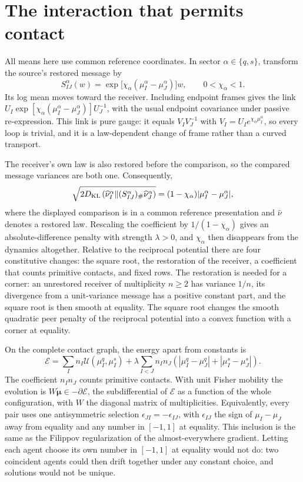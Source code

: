 \section{The interaction that permits contact}

All means here use common reference coordinates. In sector $\alpha\in\{q,s\}$, transform the source's restored message by
\begin{equation}
S_{IJ}^\alpha(w)=\exp\bigl[\chi_\alpha(\mu_I^\alpha-\mu_J^\alpha)\bigr]w,
\qquad 0<\chi_\alpha<1.
\end{equation}
Its log mean moves toward the receiver. Including endpoint frames gives the link $U_I\exp[\chi_\alpha(\mu_I^\alpha-\mu_J^\alpha)]U_J^{-1}$, with the usual endpoint covariance under passive re-expression. This link is pure gauge: it equals $V_IV_J^{-1}$ with $V_I=U_Ie^{\chi_\alpha\mu_I^\alpha}$, so every loop is trivial, and it is a law-dependent change of frame rather than a curved transport.

The receiver's own law is also restored before the comparison, so the compared message variances are both one. Consequently,
\begin{equation}
\sqrt{2D_{\mathrm{KL}}\left(\widehat\nu_I^\alpha\Vert
 (S_{IJ}^\alpha)_\#\widehat\nu_J^\alpha\right)}
=(1-\chi_\alpha)|\mu_I^\alpha-\mu_J^\alpha|,
\end{equation}
where the displayed comparison is in a common reference presentation and $\widehat\nu$ denotes a restored law. Rescaling the coefficient by $1/(1-\chi_\alpha)$ gives an absolute-difference penalty with strength $\lambda>0$, and $\chi_\alpha$ then disappears from the dynamics altogether. Relative to the reciprocal potential there are four constitutive changes: the square root, the restoration of the receiver, a coefficient that counts primitive contacts, and fixed rows. The restoration is needed for a corner: an unrestored receiver of multiplicity $n\geq2$ has variance $1/n$, its divergence from a unit-variance message has a positive constant part, and the square root is then smooth at equality. The square root changes the smooth quadratic peer penalty of the reciprocal potential into a convex function with a corner at equality.

On the complete contact graph, the energy apart from constants is
\begin{equation}
\mathcal E=\sum_I n_I\mathcal U(\mu_I^q,\mu_I^s)+
\lambda\sum_{I<J}n_In_J
\left(|\mu_I^q-\mu_J^q|+|\mu_I^s-\mu_J^s|\right).
\end{equation}
The coefficient $n_In_J$ counts primitive contacts. With unit Fisher mobility the evolution is $W\dot{\boldsymbol\mu}\in-\partial\mathcal E$, the subdifferential of $\mathcal E$ as a function of the whole configuration, with $W$ the diagonal matrix of multiplicities. Equivalently, every pair uses one antisymmetric selection $\epsilon_{JI}=-\epsilon_{IJ}$, with $\epsilon_{IJ}$ the sign of $\mu_I-\mu_J$ away from equality and any number in $[-1,1]$ at equality. This inclusion is the same as the Filippov regularization of the almost-everywhere gradient. Letting each agent choose its own number in $[-1,1]$ at equality would not do: two coincident agents could then drift together under any constant choice, and solutions would not be unique.

